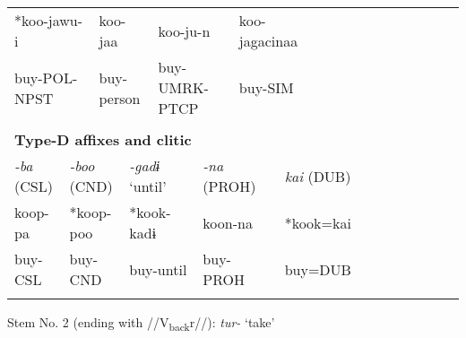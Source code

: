 \begin{tabularx}{\textwidth}{XXXXXXXXXXXXXXXXXXXXXXX}
\multicolumn{3}{X}{{ *koo-jawu-i}} & \multicolumn{2}{X}{{ koo-jaa}} & \multicolumn{5}{X}{koo-ju-n} & \multicolumn{4}{X}{{ koo-jagacinaa}} & \multicolumn{9}{X}{}\\
\multicolumn{3}{X}{buy-POL-NPST} & \multicolumn{2}{X}{buy-person} & \multicolumn{5}{X}{buy-UMRK-PTCP} & \multicolumn{4}{X}{buy-SIM} & \multicolumn{9}{X}{}\\
\multicolumn{23}{X}{}\\
\multicolumn{23}{X}{{\bfseries Type-D affixes and clitic}}\\
{ \textit{{}-ba} (CSL)} & \multicolumn{3}{X}{{ \textit{{}-boo} (CND)}} & \multicolumn{4}{X}{{ \textit{{}-gadɨ} ‘until’}} & \multicolumn{4}{X}{{ \textit{{}-na} (PROH)}} & \multicolumn{4}{X}{{ \textit{kai} (DUB)}} & \multicolumn{7}{X}{}\\
{ koop-pa} & \multicolumn{3}{X}{{ *koop-poo}} & \multicolumn{4}{X}{{ *kook-kadɨ}} & \multicolumn{4}{X}{{ koon-na}} & \multicolumn{4}{X}{{ *kook=kai}} & \multicolumn{7}{X}{}\\
buy-CSL & \multicolumn{3}{X}{buy-CND} & \multicolumn{4}{X}{buy-until} & \multicolumn{4}{X}{buy-PROH} & \multicolumn{4}{X}{buy=DUB} & \multicolumn{7}{X}{}\\
\lspbottomrule
\end{tabularx}
Stem No. 2 (ending with //V\textsubscript{back}r//): \textit{tur-} ‘take’

\tablefirsthead{}

